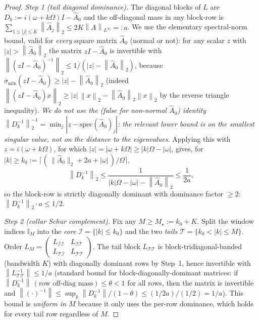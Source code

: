 \documentclass{amsart}
\theoremstyle{definition}
\newcommand{\norm}[1]{\left\lVert#1\right\rVert}
\begin{document}
\begin{proof}
\emph{Step 1 (tail diagonal dominance).} The diagonal blocks of $L$ are
$D_k:=i(\omega+k\Omega)I-\hat A_0$ and the off-diagonal mass in any block-row is
$\sum_{1\le|j|\le K}\norm{\hat A_j}_2\le 2K\norm{A}_{L^\infty}=:a$. We use the
elementary spectral-norm bound, valid for \emph{every} square matrix $\hat A_0$
(normal or not): for any scalar $z$ with $|z|>\norm{\hat A_0}_2$ the matrix
$zI-\hat A_0$ is invertible with $\norm{(zI-\hat A_0)^{-1}}_2\le
1/(|z|-\norm{\hat A_0}_2)$, because
$\sigma_{\min}(zI-\hat A_0)\ge |z|-\norm{\hat A_0}_2$ (indeed
$\norm{(zI-\hat A_0)x}_2\ge |z|\,\norm x_2-\norm{\hat A_0}_2\norm x_2$ by the
reverse triangle inequality). \emph{We do not use the (false for non-normal
$\hat A_0$) identity $\norm{D_k^{-1}}_2^{-1}=\min_j|z-\mathrm{spec}(\hat A_0)_j|$:
the relevant lower bound is on the smallest singular value, not on the distance
to the eigenvalues.} Applying this with $z=i(\omega+k\Omega)$, for which
$|z|=|\omega+k\Omega|\ge |k|\Omega-|\omega|$, gives, for
$|k|\ge k_0:=\big\lceil(\,\|\hat A_0\|_2+2a+|\omega|\,)/\Omega\big\rceil$,
\[
\norm{D_k^{-1}}_2\le\frac{1}{|k|\Omega-|\omega|-\norm{\hat A_0}_2}\le\frac{1}{2a},
\]
so the block-row is strictly diagonally dominant with dominance factor $\ge 2$:
$\norm{D_k^{-1}}_2\cdot a\le 1/2$.

\emph{Step 2 (collar Schur complement).} Fix any $M\ge M_\star:=k_0+K$. Split the
window indices $\mathbb I_M$ into the \emph{core} $\mathcal I=\{|k|\le k_0\}$ and
the two \emph{tails} $\mathcal T=\{k_0<|k|\le M\}$. Order $L_M=\left(\begin{smallmatrix}
L_{\mathcal I\mathcal I}&L_{\mathcal I\mathcal T}\\ L_{\mathcal T\mathcal I}&
L_{\mathcal T\mathcal T}\end{smallmatrix}\right)$. The tail block $L_{\mathcal T\mathcal T}$
is block-tridiagonal-banded (bandwidth $K$) with diagonally dominant rows by
Step~1, hence invertible with $\norm{L_{\mathcal T\mathcal T}^{-1}}\le 1/a$
(standard bound for block-diagonally-dominant matrices: if
$\norm{D_k^{-1}}\,(\text{row off-diag mass})\le\theta<1$ for all rows, then the
matrix is invertible and $\norm{(\cdot)^{-1}}\le \sup_k\norm{D_k^{-1}}/(1-\theta)
\le (1/2a)/(1/2)=1/a$). This bound is \emph{uniform in $M$} because it only uses
the per-row dominance, which holds for every tail row regardless of $M$.


\end{proof}
\end{document}
